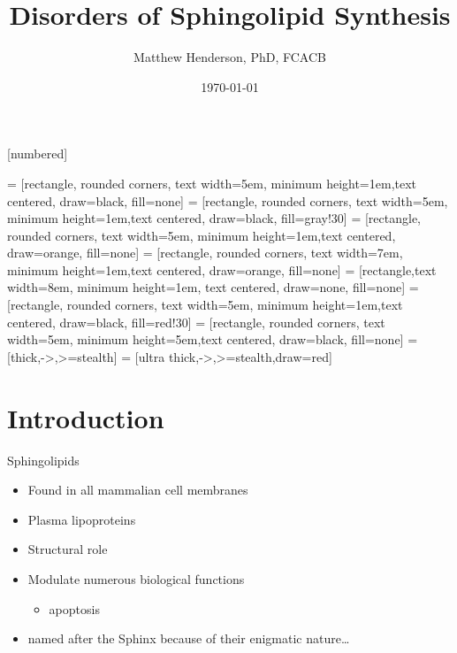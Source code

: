 \documentclass[presentation, smaller]{beamer}
\author{Matthew Henderson, PhD, FCACB}
\date{\today}
\title{Disorders of Sphingolipid Synthesis}
\institute[NSO]{Newborn Screening Ontario | The University of Ottawa}
\begin{document}
\maketitle

\vspace{220pt}
\beamertemplatenavigationsymbolsempty
{}[numbered]

 = [rectangle, rounded corners, text width=5em, minimum height=1em,text centered, draw=black, fill=none]
 = [rectangle, rounded corners, text width=5em, minimum height=1em,text centered, draw=black, fill=gray!30]
 = [rectangle, rounded corners, text width=5em, minimum height=1em,text centered, draw=orange, fill=none]
 = [rectangle, rounded corners, text width=7em, minimum height=1em,text centered, draw=orange, fill=none]
 = [rectangle,text width=8em, minimum height=1em, text centered, draw=none, fill=none]
 = [rectangle, rounded corners, text width=5em, minimum height=1em,text centered, draw=black, fill=red!30]
 = [rectangle, rounded corners, text width=5em, minimum height=5em,text centered, draw=black, fill=none]
 = [thick,->,>=stealth]
 = [ultra thick,->,>=stealth,draw=red]


\section{Introduction}
\label{sec:orgheadline6}
\begin{frame}[label={sec:orgheadline1}]{Sphingolipids}
\begin{itemize}
\item Found in all mammalian cell membranes
\item Plasma lipoproteins
\item Structural role
\item Modulate numerous biological functions
\begin{itemize}
\item apoptosis
\end{itemize}
\item named after the Sphinx because of their enigmatic nature\ldots{}
\end{itemize}
\end{frame}
\end{document}
